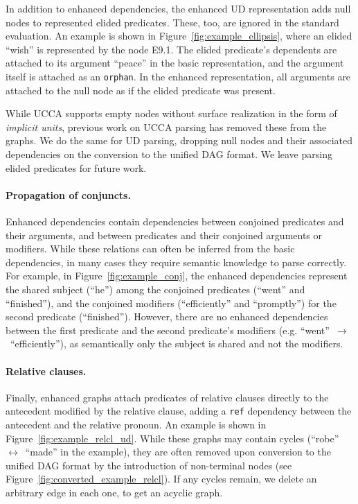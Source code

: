 \documentclass[11pt,a4paper]{article}
\begin{document}
In addition to enhanced dependencies, the enhanced UD representation
adds null nodes to represented elided predicates.
These, too, are ignored in the standard evaluation.
An example is shown in Figure~\ref{fig:example_ellipsis},
where an elided ``wish'' is represented by the node E9.1.
The elided predicate's dependents are attached to its argument ``peace''
in the basic representation, and the argument itself is attached as an \verb|orphan|.
In the enhanced representation, all arguments are attached to the null node as if
the elided predicate was present.

While UCCA supports empty nodes without surface realization
in the form of \textit{implicit units},
previous work on UCCA parsing has removed these from the graphs.
We do the same for UD parsing, dropping null nodes and their
associated dependencies on the conversion to the unified DAG format.
We leave parsing elided predicates for future work.

\paragraph{Propagation of conjuncts.}

Enhanced dependencies contain dependencies between conjoined predicates
and their arguments, and between predicates and their conjoined arguments
or modifiers.
While these relations can often be inferred from the basic dependencies,
in many cases they require semantic knowledge to parse correctly.
For example, in Figure~\ref{fig:example_conj},
the enhanced dependencies represent the shared subject (``he'') among the
conjoined predicates (``went'' and ``finished''),
and the conjoined modifiers (``efficiently'' and ``promptly'')
for the second predicate (``finished'').
However, there are no enhanced dependencies between the first predicate
and the second predicate's modifiers (e.g. ``went''~$\to$~``efficiently''),
as semantically only the subject is shared and not the modifiers.

\paragraph{Relative clauses.}

Finally, enhanced graphs attach predicates of relative clauses directly
to the antecedent modified by the relative clause, adding a \verb|ref|
dependency between the antecedent and the relative pronoun.
An example is shown in Figure~\ref{fig:example_relcl_ud}.
While these graphs may contain cycles
(``robe''~$\leftrightarrow$~``made''
in the example), they are often removed upon conversion to
the unified DAG format by the introduction of non-terminal nodes
(see Figure~\ref{fig:converted_example_relcl}).
If any cycles remain, we delete an arbitrary edge in each one, to
get an acyclic graph.
\end{document}

